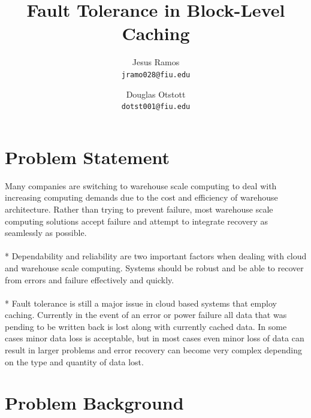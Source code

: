 \documentclass[letterpaper,12pt]{article}
\title{Fault Tolerance in Block-Level Caching}
\author{
  Jesus Ramos \\ \texttt{jramo028@fiu.edu} \and
  Douglas Otstott \\ \texttt{dotst001@fiu.edu}
}
\date{}
\begin{document}
\maketitle
\thispagestyle{empty}

\section*{Problem Statement}

Many companies are switching to warehouse scale computing to deal with
increasing computing demands due to the cost and efficiency of
warehouse architecture. Rather than trying to prevent failure, most
warehouse scale computing solutions accept failure and attempt to
integrate recovery as seamlessly as possible\cite{Placeholder}.
\\ \\*
%
Dependability and reliability are two important factors when dealing
with cloud and warehouse scale computing. Systems should be robust and
be able to recover from errors and failure effectively and quickly.
\\ \\*
%
Fault tolerance is still a major issue in cloud based systems that
employ caching. Currently in the event of an error or power failure
all data that was pending to be written back is lost along with
currently cached data. In some cases minor data loss is acceptable,
but in most cases even minor loss of data can result in larger
problems and error recovery can become very complex depending on the
type and quantity of data lost.


\section*{Problem Background}
\end{document}
